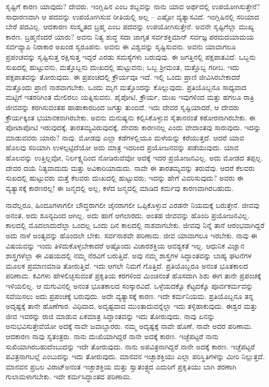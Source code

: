 ಸೃಷ್ಟಿಗೆ ಕಾರಣ ಯಾವುದು? ದೇವರು. ಇಂಗ್ಲಿಷಿನ  ಎಂಬ ಶಬ್ದವನ್ನು ನಾನು ಯಾವ ಅರ್ಥದಲ್ಲಿ ಉಪಯೋಗಿಸುತ್ತೇನೆ? ಸಾಧಾರಣವಾಗಿ ಆ ಪದವನ್ನು ಉಪಯೋಗಿಸುವ ರೀತಿಯಲ್ಲಿ ಅಲ್ಲ – ಎಷ್ಟೋ ವ್ಯತ್ಯಾಸವಿದೆ. ಇಂಗ್ಲಿಷಿನಲ್ಲಿ ಸರಿಯಾದ ಬೇರೆ ಪದವಿಲ್ಲ. ಆದಕಾರಣ ಸಂಸ್ಕೃತದ ಬ್ರಹ್ಮ ಎಂಬ ಪದವನ್ನು ಉಪಯೋಗಿಸುತ್ತೇನೆ. ಅವನೇ ಸೃಷ್ಟಿಗೆಲ್ಲಾ ಮುಖ್ಯ ಕಾರಣ. ಬ್ರಹ್ಮನೆಂದರೆ ಯಾರು? ಅವನು ನಿತ್ಯ ಶುದ್ಧ ಸದಾ ಜಾಗೃತ ಸರ್ವಶಕ್ತಿಮಾನ್​ ಸರ್ವಜ್ಞ ಪರಮದಯಾಮಯ ಸರ್ವವ್ಯಾಪಿ ನಿರಾಕಾರ ಅಖಂಡ ಸ್ವರೂಪನು. ಅವನು ಈ ವಿಶ್ವವನ್ನು ಸೃಷ್ಟಿಸುವನು. ಅವನು ಯಾವಾಗಲೂ ಪ್ರಪಂಚವನ್ನು ಸೃಷ್ಟಿಸುತ್ತ ರಕ್ಷಿಸುತ್ತ ಇದ್ದರೆ ಎರಡು ಸಮಸ್ಯೆಗಳು ಬರುವುವು. ಈ ಜಗತ್ತಿನಲ್ಲಿ ಪಕ್ಷಪಾತವಿದೆ. ಒಬ್ಬನು ಸುಖದಲ್ಲಿ ಹುಟ್ಟುವನು, ಮತ್ತೊಬ್ಬನು ದುಃಖದಲ್ಲಿ ಹುಟ್ಟುವನು; ಒಬ್ಬ ಶ‍್ರೀಮಂತ, ಮತ್ತೊಬ್ಬ ಗರೀಬ. ಇದು ಪಕ್ಷಪಾತವನ್ನು ತೋರುವುದು. ಈ ಪ್ರಪಂಚದಲ್ಲಿ ಕ್ರೌರ್ಯವೂ ಇದೆ. ಇಲ್ಲಿ ಒಂದು ಪ್ರಾಣಿ ಜೀವಿಸಿರಬೇಕಾದರೆ ಮತ್ತೊಂದು ಪ್ರಾಣಿ ನಾಶವಾಗಬೇಕು. ಒಂದು ಮೃಗ ಮತ್ತೊಂದನ್ನು ಕೊಲ್ಲುವುದು. ಪ್ರತಿಯೊಬ್ಬನೂ ಸಾಧ್ಯವಾದ ಮಟ್ಟಿಗೆ ಇತರರಿಗಿಂತ ಮೇಲಿರಲು ಯತ್ನಿಸುವನು. ಪೈಪೋಟಿ, ಕ್ರೌರ್ಯ, ದುಃಖ ಇವುಗಳಿಂದ ಮತ್ತು ಹಗಲೂ ರಾತ್ರಿ ಜೀವವನ್ನು ಕರಗಿಸುವಂತಹ ಹಾಹಾಕಾರದಿಂದ ಜಗತ್ತು ತುಂಬಿದೆ. ಇದು ದೇವರ ಸೃಷ್ಟಿಯಾದರೆ, ಆ ದೇವರು ಕ್ರೌರ್ಯಕ್ಕಿಂತ ಭಯಾನಕನಾಗಿರಬೇಕು. ಅವನು ಮನುಷ್ಯನು ಕಲ್ಪಿಸಿಕೊಳ್ಳುವ ಸೈತಾನನಂತೆ ಕಠೋರನಾಗಿರಬೇಕು. ಈ ಪೋಟಾಪೋಟಿ ಇರುವುದಕ್ಕೆ, ತಾರತಮ್ಯವಿರುವುದಕ್ಕೆ, ದೇವರು ಕಾರಣನಲ್ಲ ಎಂದು ವೇದಾಂತವು ಸಾರುವುದು. ಇದನ್ನು ಮಾಡುವವರು ಯಾರು? ನಾವು. ಮೋಡವು ಎಲ್ಲಾ ಕಡೆಗಳಲ್ಲಿಯೂ ಮಳೆಯನ್ನು ಕರೆಯುತ್ತದೆ. ಆದರೆ ಯಾವ ಹೊಲವು ಸರಿಯಾಗಿ ಉಳಲ್ಪಟ್ಟಿದೆಯೋ ಅದು ಮಾತ್ರ ಇದರಿಂದ ಪ್ರಯೋಜನವನ್ನು ಪಡೆಯುವುದು. ಯಾವ ಹೊಲವನ್ನು ಉತ್ತಿಲ್ಲವೋ, ನಿರ್ಲಕ್ಷ್ಯದಿಂದ ನೋಡಿರುವೆವೋ ಅದಕ್ಕೆ ಇದರ ಪ್ರಯೋಜನವಿಲ್ಲ. ಅದು ಮೋಡದ ತಪ್ಪಲ್ಲ. ದೇವರ ದಯೆ ನಿತ್ಯವಾದುದು ಮತ್ತು ಅವಿಕಾರಿಯಾದುದು. ನಾವೇ ಈ ತಾರತಮ್ಯವನ್ನು ತರುವೆವು. ಆದರೆ ಕೆಲವರು ಸುಖದಲ್ಲಿ ಹುಟ್ಟುವರು ಮತ್ತೆ ಕೆಲವರು ದುಃಖದಲ್ಲಿ ಹುಟ್ಟುವರು; ಇದನ್ನು ಹೇಗೆ ವಿವರಿಸುವುದು? ಅವರು ಈ ವ್ಯತ್ಯಾಸಕ್ಕೆ ಕಾರಣರಲ್ಲ! ಈ ಜನ್ಮದಲ್ಲಿ ಅಲ್ಲ, ಕಳೆದ ಜನ್ಮದಲ್ಲಿ ಮಾಡಿದ ಕರ್ಮವು ಕಾರಣವಾಗಿರಬಹುದು.

ನಾವೆಲ್ಲರೂ, ಹಿಂದೂಗಳಾಗಲೀ ಬೌದ್ಧರಾಗಲೀ ಜೈನರಾಗಲೀ ಒಪ್ಪಿಕೊಳ್ಳುವ ಎರಡನೇ ನಿಯಮಕ್ಕೆ ಬರುತ್ತೇನೆ. ಜೀವವು ಅನಂತ, ಅದು ಶೂನ್ಯದಿಂದ ಆಗಿಲ್ಲ. ಅದು ಹಾಗೆ ಆಗಲಾರದು. ಅಂತಹ ಜೀವವನ್ನು ಹೊಂದಿ ಪ್ರಯೋಜನವಿಲ್ಲ. ಕಾಲದಲ್ಲಿ ಮೊದಲಾದುದೆಲ್ಲಾ ಒಂದಲ್ಲ ಒಂದು ದಿನ ಕಾಲದಲ್ಲಿ ನಾಶವಾಗಬೇಕು. ಜೀವವು ನಿನ್ನೆ ತಾನೆ ಆರಂಭವಾಗಿದ್ದರೆ ಅದು ನಾಳೆ ಅಂತ್ಯವನ್ನು ಹೊಂದಲೇ ಬೇಕು. ಸರ್ವನಾಶವೇ ಪರಿಣಾಮ. ಜೀವ ಯಾವಾಗಲೂ ಇರಬೇಕು. ನಾವು ಈ ವಿಷಯವನ್ನು ಇಂದು ತಿಳಿದುಕೊಳ್ಳಬೇಕಾದರೆ ಅಷ್ಟೊಂದು ವಿಚಾರಶಕ್ತಿಯ ಆವಶ್ಯಕತೆ ಇಲ್ಲ. ಆಧುನಿಕ ವಿಜ್ಞಾನ ಶಾಸ್ತ್ರಗಳೆಲ್ಲಾ ಈ ವಿಷಯದಲ್ಲಿ ನಮ್ಮ ನೆರವಿಗೆ ಬರುತ್ತಿವೆ. ಅವು ನಮ್ಮ ಶಾಸ್ತ್ರಗಳ ಸಿದ್ಧಾಂತವನ್ನು ಬಾಹ್ಯ ಘಟನೆ\-ಗಳ ಮೂಲಕ ಪ್ರಮಾಣಮಾಡಿ ತೋರುತ್ತಿವೆ. ಇದು ಆಗಲೇ ನಿಮಗೆ ಗೊತ್ತಿದೆ. ಪ್ರತಿಯೊಬ್ಬರೂ ಅನಂತ ಭೂತಕಾಲದ ಪರಿಣಾಮ. ಕವಿಗಳು ಹೇಳಲಿಚ್ಛಿಸುವಂತೆ ಪ್ರಕೃತಿಯ ಕರಗಳಿಂದ ಮಿಂಚಿನಂತೆ ಹೊಸದಾಗಿ ಶಿಶು ಈಗ ತಾನೇ ಪ್ರಪಂಚಕ್ಕೆ ಇಳಿಯಲಿಲ್ಲ. ಆ ಮಗುವಿನಲ್ಲಿ ಅನಂತ ಭೂತಕಾಲದ ಸಂಸ್ಕಾರವಿದೆ. ಒಳ್ಳೆಯದಕ್ಕೊ ಕೆಟ್ಟದಕ್ಕೊ ಪೂರ್ವಕರ್ಮವನ್ನು ಸವೆಯಿಸಲು ಅದು ಪ್ರಪಂಚಕ್ಕೆ ಬರುವುದು. ಅದೇ ವ್ಯತ್ಯಾಸಕ್ಕೆ ಕಾರಣ. ಇದೇ ಕರ್ಮನಿಯಮ. ಪ್ರತಿಯೊಬ್ಬನೂ ತನ್ನ ಅದೃಷ್ಟಕ್ಕೆ ತಾನೇ ಹೊಣೆಗಾರ. ವಿಧಿವಾದ, ಅದೃಷ್ಟವಾದ ಮುಂತಾದುವನ್ನೆಲ್ಲಾ ಇದು ತಳ್ಳಿಹಾಕುವುದು. ಈಶ್ವರ ಮತ್ತು ಜೀವ ಇವರನ್ನು ರಾಜಿ ಮಾಡುವ ಏಕಮಾತ್ರ ಸಿದ್ಧಾಂತವನ್ನು ಇದು ತೋರುವುದು. ನಾವು ಏನನ್ನು ಅನುಭವಿಸುತ್ತೇವೆಯೋ ಅದಕ್ಕೆ ನಾವೇ ಜವಾಬ್ದಾರರು. ನಮ್ಮ ಅದೃಷ್ಟಕ್ಕೆ ನಾವೇ ಹೊಣೆ, ನಾವೇ ಅದರ ಪರಿಣಾಮ. ಆದಕಾರಣ ನಾವು ಸ್ವತಂತ್ರರು. ನಾನು ದುಃಖಿಯಾಗಿದ್ದರೆ ನಾನೇ ಅದಕ್ಕೆ ಕಾರಣ. ಇಚ್ಛೆಪಟ್ಟರೆ ನಾನು ಸುಖಿಯಾಗಿರಬಹುದೆಂಬುದನ್ನು ಇದೇ ತೋರುವುದು. ನಾನು ಅಪವಿತ್ರನಾಗಿದ್ದರೆ ನಾನೇ ಅದಕ್ಕೆ ಕಾರಣ. ಇಚ್ಛೆಪಟ್ಟರೆ ಪವಿತ್ರನಾಗಬಲ್ಲೆ ಎಂಬುದನ್ನು ಇದು ತೋರುವುದು. ಮಾನವನ ಇಚ್ಛಾಶಕ್ತಿಯು ಎಲ್ಲಾ ಪರಿಸ್ಥಿತಿಗಳನ್ನು ಮೀರಿ ನಿಲ್ಲುತ್ತದೆ. ಮಾನವನ ಪ್ರಬಲ ವಿರಾಟ್​ ಅನಂತ ಇಚ್ಛಾಶಕ್ತಿಯ ಮತ್ತು ಸ್ವಾತಂತ್ರ್ಯದ ಎದುರಿಗೆ ಪ್ರಕೃತಿಯು ಬಾಗಿ ಶರಣಾಗಿ ಗುಲಾಮಳಾಗಬೇಕು. ಇದೇ ಕರ್ಮಸಿದ್ಧಾಂತದ ಪರಿಣಾಮ.

